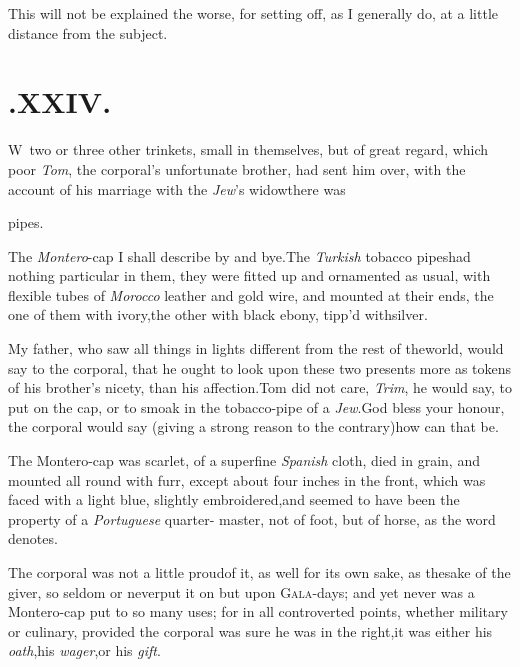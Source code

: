 \documentclass{article}
\begin{document}
This will not be explained the worse, for setting off, as I
generally do, at a little distance from the subject.

\vfill{}\eject
\section{.\enspace XXIV.}

\lettrine{W}{\,} two or three other trinkets,
small in themselves, but of great regard, which poor \textit{Tom},
the corporal’s unfortunate brother, had sent him over, with
the account of his marriage with the \textit{Jew}’s
widow\tsh there was

\noindent
{}\break pipes.

The \textit{Montero}-cap I shall describe by and bye.\tsk The
\textit{Turkish} tobacco pipes\break had nothing particular in them, they
were fitted up and ornamented as usual, with flexible tubes of
\textit{Morocco} leather and gold wire, and mounted at their ends,
the one of them with ivory,\tsk the other with black ebony,
tipp’d with\break silver.

My father, who saw all things in lights different from the rest
of the\break world, would say to the corporal, that he ought to look
upon these two presents more as tokens of his brother’s nicety,
than his affection.\tsh Tom did not care, \textit{Trim}, he
would say, to put on the cap, or to smoak in the tobacco-pipe of
a \textit{Jew}.\break\tsh God bless your honour, the corporal would
say (giving a strong reason to the contrary)\tsk how can that
be.\tsh

The Montero-cap was scarlet, of a superfine \textit{Spanish}
cloth, died in grain, and mounted all round with furr, except about
four inches in the front, which was faced with a light blue,
slightly embroidered,\tsk and seemed to have been the property of
a \textit{Portuguese} quarter- master, not of foot, but of horse, as
the word denotes.

The corporal was not a little proud\break of it, as well for its own
sake, as the\break sake of the giver, so seldom or never\break put it on but
upon \textsc{Gala}-days; and yet never was a Montero-cap put
to so many uses; for in all controverted points, whether military
or culinary, provided the corporal was sure he was in the
right,\break\tsk it was either his \textit{oath},\tsk his
\textit{wager},\tsk\break or his \textit{gift}.
\end{document}
